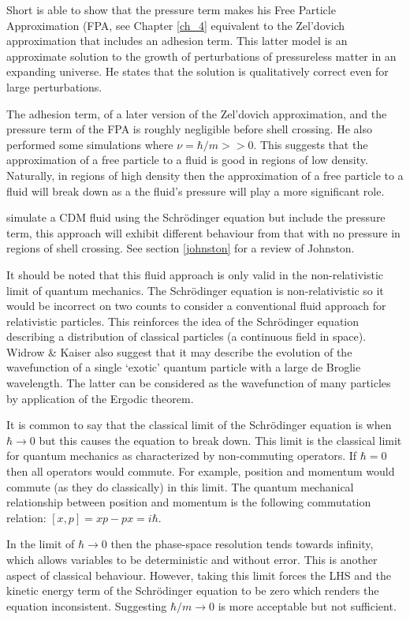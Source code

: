Short is able to show that the pressure term makes his Free Particle Approximation (FPA, see Chapter \ref{ch_4} equivalent to the Zel'dovich approximation \citep{bib_zel2} that includes an adhesion term. This latter model is an approximate solution to the growth of perturbations of pressureless matter in an expanding universe. He states that the solution is qualitatively correct even for large perturbations.

The adhesion term, of a later version of the Zel'dovich approximation, and the pressure term of the FPA is roughly negligible before shell crossing. He also performed some simulations where $\nu = \hbar / m >> 0$. This suggests that the approximation of a free particle to a fluid is good in regions of low density. Naturally, in regions of high density then the approximation of a free particle to a fluid will break down as a the fluid's pressure will play a more significant role.

\citet{bib_rj} simulate a CDM fluid using the Schr\"odinger equation but include the pressure term, this approach will exhibit different behaviour from that with no pressure in regions of shell crossing. See section \ref{johnston} for a review of Johnston.
\newline

It should be noted that this fluid approach is only valid in the non-relativistic limit of quantum mechanics. The Schr\"odinger equation is non-relativistic so it would be incorrect on two counts to consider a conventional fluid approach for relativistic particles. This reinforces the idea of the Schr\"odinger equation describing a distribution of classical particles (a continuous field in space). Widrow \& Kaiser also suggest that it may describe the evolution of the wavefunction of a single `exotic' quantum particle with a large de Broglie wavelength. The latter can be considered as the wavefunction of many particles by application of the Ergodic theorem.

It is common to say that the classical limit of the Schr\"odinger equation is when $\hbar \rightarrow 0$ but this causes the equation to  break down. This limit is the classical limit for quantum mechanics as characterized by non-commuting operators. If $\hbar = 0$ then all operators would commute. For example, position and momentum would commute (as they do classically) in this limit. The quantum mechanical relationship between position and momentum is the following commutation relation: $ [x,p] = xp - px = i\hbar$.

In the limit of $\hbar \rightarrow 0$ then the phase-space resolution tends towards infinity, which allows variables to be deterministic and without error. This is another aspect of classical behaviour. However, taking this limit forces the LHS and the kinetic energy term of the Schr\"odinger equation to be zero which renders the equation inconsistent. Suggesting $\hbar /m \rightarrow 0$ is more acceptable but not sufficient.
\newline


